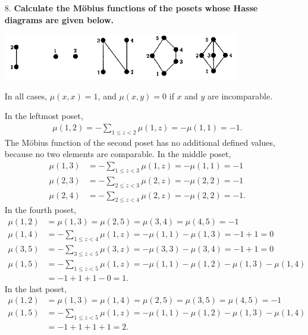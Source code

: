 \documentclass[a4paper,12pt]{article}
\begin{document}
\begin{enumerate}
    \item[8.]
        \boldmath
        \textbf{Calculate the M\"obius functions of the posets whose Hasse diagrams are given below.}
        \unboldmath
        \begin{center}
            \includegraphics{fig12-1}
        \end{center}
        In all cases, $\mu(x, x) = 1$, and $\mu(x, y) = 0$ if $x$ and $y$ are incomparable. \par
        In the leftmost poset, 
        \begin{align*}
            \mu(1, 2) = -\sum_{1 \leq z < 2} \mu(1, z) = -\mu(1, 1) = -1.
        \end{align*}
        The M\"obius function of the second poset has no additional defined values, because no two elements are comparable. In the middle poset,
        \begin{align*}
            \mu(1, 3) &= -\sum_{1 \leq z < 3} \mu(1, z) = -\mu(1, 1) = -1 \\
            \mu(2, 3) &= -\sum_{2 \leq z < 3} \mu(2, z) = -\mu(2, 2) = -1 \\
            \mu(2, 4) &= -\sum_{2 \leq z < 4} \mu(2, z) = -\mu(2, 2) = -1.
        \end{align*}
        In the fourth poset,
        \begin{align*}
            \mu(1, 2) &= \mu(1, 3) = \mu(2, 5) = \mu(3, 4) = \mu(4, 5) = -1 \\
            \mu(1, 4) &= -\sum_{1 \leq z < 4} \mu(1, z) = -\mu(1, 1) - \mu(1, 3) = -1 + 1 = 0 \\
            \mu(3, 5) &= -\sum_{3 \leq z < 5} \mu(3, z) = -\mu(3, 3) - \mu(3, 4) = -1 + 1 = 0 \\
            \mu(1, 5) &= -\sum_{1 \leq z < 5} \mu(1, z) = -\mu(1, 1) - \mu(1, 2) - \mu(1, 3) - \mu(1, 4) \\
            &= -1 + 1 + 1 - 0 = 1.
        \end{align*}
        In the last poset,
        \begin{align*}
            \mu(1, 2) &= \mu(1, 3) = \mu(1, 4) = \mu(2, 5) = \mu(3, 5) = \mu(4, 5) = -1 \\
            \mu(1, 5) &= -\sum_{1 \leq z < 5} \mu(1, z) = -\mu(1, 1) - \mu(1, 2) - \mu(1, 3) - \mu(1, 4) \\
            &= -1 + 1 + 1 + 1 = 2.
        \end{align*}
\end{enumerate}
\end{document}
